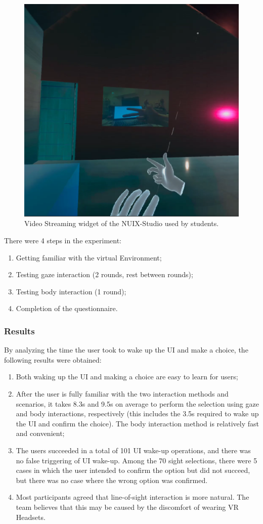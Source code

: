 \begin{figure}
  \centering
  \includegraphics[width=0.6\linewidth]{figures/VideoStreamingWidget.png}
  \caption{Video Streaming widget of the NUIX-Studio used by students.}
  \label{fig:VideoStreamingWidget-figure}
\end{figure}


There were 4 steps in the experiment:
\begin{enumerate}
    \item Getting familiar with the virtual Environment;
    \item Testing gaze interaction (2 rounds, rest between rounds);
    \item Testing body interaction (1 round);
    \item Completion of the questionnaire.
\end{enumerate}

\subsubsection{Results}

By analyzing the time the user took to wake up the UI and make a choice, the following results were obtained:
\begin{enumerate}
    \item Both waking up the UI and making a choice are easy to learn for users;
    \item After the user is fully familiar with the two interaction methods and scenarios, it takes 8.3s and 9.5s on average to perform the selection using gaze and body interactions, respectively (this includes the 3.5s required to wake up the UI and confirm the choice). The body interaction method is relatively fast and convenient;
    \item The users succeeded in a total of 101 UI wake-up operations, and there was no false triggering of UI wake-up. Among the 70 sight selections, there were 5 cases in which the user intended to confirm the option but did not succeed, but there was no case where the wrong option was confirmed. 
    \item Most participants agreed that line-of-sight interaction is more natural. The team believes that this may be caused by the discomfort of wearing VR Headsets.
\end{enumerate}

